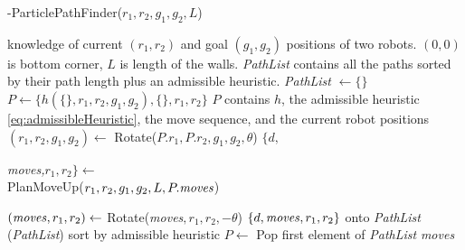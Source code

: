 \begin{algorithm}[htb]
\caption{ { -ParticlePathFinder}($r_1,r_2,g_1,g_2,L$)}\label{alg:optimalAlg}
\begin{algorithmic}[1]
\Require knowledge of current $(r_1,r_2)$ and goal $(g_1,g_2)$ positions of  two robots. 
$(0,0)$ is bottom corner,
 $L$ is length of the walls. 
 \emph{PathList} contains all the paths sorted by their path length plus an admissible heuristic. 
 \State  \emph{PathList} $\gets \{\}$
 \State $P \gets   \{ h(\{\},r_1,r_2,g_1,g_2  ) ,\{\},r_1,r_2\} $ \Comment $P$ contains $h$, the admissible heuristic \eqref{eq:admissibleHeuristic}, the move sequence, and the current robot positions
\State $(r_1,r_2,g_1,g_2) \gets$ {\sc Rotate}($P.r_1,P.r_2,g_1,g_2,\theta$)
\State $\{d, $ \parbox[t]{.3\linewidth}{%
 \emph{moves,}$ r_1,r_2\} \gets$\\
 {\sc  PlanMoveUp}($r_1,r_2,g_1,g_2,L, P.\text{\emph{moves}}$)}
\State $(\text{\emph{moves}}, r_1,r_2) \gets$ {\sc Rotate}(\emph{moves}$, r_1,r_2,-\theta$)
 $\{d, \text{\emph{moves}}, r_1,r_2\} $ onto \emph{PathList}
\EndFor
{}(\emph{PathList}) \Comment sort by admissible heuristic
\State $P \gets $ {\sc Pop} first element of \emph{PathList}
\EndWhile
\State \Return \emph{moves}
\end{algorithmic}
\end{algorithm}


